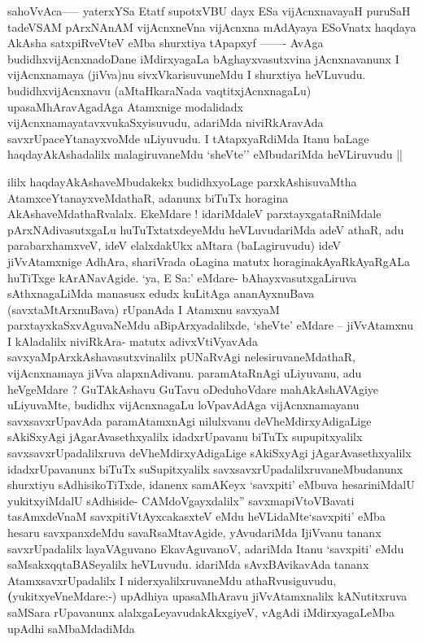\begin{artha}
sahoVvAca----- yaterxYSa Etatf supotxV\s BU dayx ESa vijAcnxnavayaH
puruSaH tadeVSAM pArxNAnAM vijAcnxneVna vijAcnxna mAdAyaya ESoV\s natx
haqdaya AkAsha satxpiRveVteV  eMba shurxtiya tApapxyf ------- AvAga
budidhxvijAcnxnadoDane iMdirxyagaLa bAghayxvasutxvina jAcnxnavanunx I
vijAcnxnamaya (jiVva)nu sivxVkarisuvuneMdu I shurxtiya
heVLuvudu. budidhxvijAcnxnavu (aMtaHkaraNada vaqtitxjAcnxnagaLu)
upasaMhAravAgadAga Atamxnige modalidadx
vijAcnxnamayatavxvukaSxyisuvudu, adariMda niviRkAravAda
savxrUpaceYtanayxvoMde uLiyuvudu. I tAtapxyaRdiMda Itanu baLage
haqdayAkAshadalilx malagiruvaneMdu `sheVte'' eMbudariMda heVLiruvudu ||
\end{artha}

\begin{artha}
ililx haqdayAkAshaveMbudakekx budidhxyoLage parxkAshisuvaMtha
AtamxceYtanayxveMdathaR, adanunx biTuTx horagina
AkAshaveMdathaRvalalx. EkeMdare ! idariMdaleV parxtayxgataRniMdale
pArxNAdivasutxgaLu huTuTxtatxdeyeMdu heVLuvudariMda adeV athaR, adu
parabarxhamxveV, ideV elalxdakUkx aMtara (baLagiruvudu) ideV
jiVvAtamxnige AdhAra, shariVrada oLagina matutx horaginakAyaRkAyaRgALa
huTiTxge kArANavAgide. `ya, E Sa:' eMdare- bAhayxvasutxgaLiruva
sAthxnagaLiMda manasusx edudx kuLitAga ananAyxnuBava
(savxtaMtArxnuBava) rUpanAda I Atamxnu savxyaM parxtayxkaSxvAguvaNeMdu
aBipArxyadalilxde, `sheVte' eMdare -- jiVvAtamxnu I kAladalilx
niviRkAra- matutx adivxVtiVyavAda savxyaMpArxkAshavasutxvinalilx
pUNaRvAgi nelesiruvaneMdathaR, vijAcnxnamaya jiVva
alapxnAdivanu. paramAtaRnAgi uLiyuvanu, adu heVgeMdare ? GuTAkAshavu
GuTavu oDeduhoVdare mahAkAshAVAgiye uLiyuvaMte, budidhx vijAcnxnagaLu
loVpavAdAga vijAcnxnamayanu savxsavxrUpavAda paramAtamxnAgi nilulxvanu
deVheMdirxyAdigaLige sAkiSxyAgi jAgarAvasethxyalilx idadxrUpavanu
biTuTx supupitxyalilx savxsavxrUpadalilxruva deVheMdirxyAdigaLige
sAkiSxyAgi jAgarAvasethxyalilx idadxrUpavanunx biTuTx suSupitxyalilx
savxsavxrUpadalilxruvaneMbudanunx shurxtiyu sAdhisikoTiTxde, idanenx
samAKeyx `savxpiti' eMbuva hesariniMdalU yukitxyiMdalU sAdhiside-
CAMdoVgayxdalilx'' savxmapiVtoVBavati tasAmxdeVnaM
savxpitiVtAyxcakasxteV eMdu heVLidaMte`savxpiti' eMba hesaru
savxpanxdeMdu savaRsaMtavAgide, yAvudariMda IjiVvanu tananx
savxrUpadalilx layaVAguvano EkavAguvanoV, adariMda Itanu `savxpiti'
eMdu saMsakxqqtaBASeyalilx heVLuvudu. idariMda sAvxBAvikavAda tananx
AtamxsavxrUpadalilx I niderxyalilxruvaneMdu
athaRvusiguvudu,\textbf(yukitxyeVneMdare:-) upAdhiya upasaMhAravu
jiVvAtamxnalilx kANutitxruva saMSara rUpavanunx
alalxgaLeyavudakAkxgiyeV, vAgAdi iMdirxyagaLeMba upAdhi saMbaMdadiMda

\end{artha}

